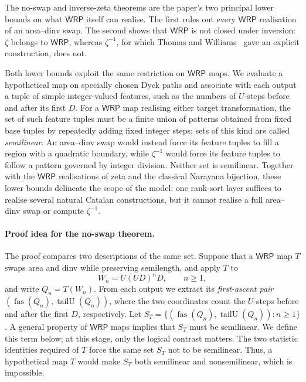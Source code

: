 \documentclass[11pt]{article}
\theoremstyle{definition}
\newcommand{\WRP}{\mathsf{WRP}}
\newcommand{\fas}{\operatorname{fas}}
\newcommand{\tailU}{\operatorname{tailU}}
\begin{document}
The no-swap and inverse-zeta theorems are the paper's two principal lower
bounds on what $\WRP$ itself can realise.  The first rules out every $\WRP$
realisation of an area--dinv swap.  The second shows that $\WRP$ is not closed
under inversion: $\zeta$ belongs to $\WRP$, whereas $\zeta^{-1}$, for which
Thomas and Williams~\cite{ThomasWilliams2018} gave an explicit construction,
does not.

Both lower bounds exploit the same restriction on $\WRP$ maps.  We evaluate a
hypothetical map on specially chosen Dyck paths and associate with each output
a tuple of simple integer-valued features, such as the numbers of
$U$-steps before and after its first $D$.  For a $\WRP$ map realising either
target transformation, the set of such feature tuples must be a finite union
of patterns obtained from fixed base tuples by repeatedly adding fixed integer
steps; sets of this kind are called \emph{semilinear}.  An area--dinv swap
would instead force its feature tuples to fill a region with a quadratic
boundary, while $\zeta^{-1}$ would force its feature tuples to follow a
pattern governed by integer division.  Neither set is semilinear.  Together
with the $\WRP$ realisations of zeta and the classical Narayana bijection,
these lower bounds delineate the scope of the model: one rank-sort layer
suffices to realise several natural Catalan constructions, but it cannot
realise a full area--dinv swap or compute $\zeta^{-1}$.

\paragraph{Proof idea for the no-swap theorem.}

The proof compares two descriptions of the same set.  Suppose that a $\WRP$
map $T$ swaps area and dinv while preserving semilength, and apply $T$ to
\begin{equation}
\label{eq:zigzag-family}
   W_n=U(UD)^nD,\qquad n\ge 1,
\end{equation}
and write $Q_n=T(W_n)$.  From each output we extract its \emph{first-ascent
pair} $(\fas(Q_n),\tailU(Q_n))$, where the two coordinates count the $U$-steps
before and after the first $D$, respectively.  Let
$S_T=\{(\fas(Q_n),\tailU(Q_n)):n\ge 1\}$.
A general property of $\WRP$ maps implies that $S_T$ must be semilinear.
We define this term below; at this stage, only the logical contrast matters.
The two statistic identities required of $T$ force the same set $S_T$ not to
be semilinear.  Thus, a hypothetical map $T$ would make $S_T$ both semilinear
and nonsemilinear, which is impossible.
\end{document}
